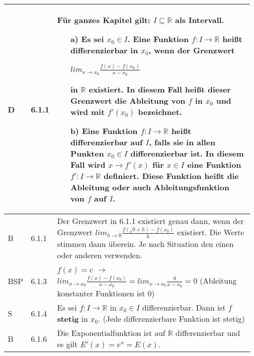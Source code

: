     \begin{longtable}{p{0.75cm} p{1cm} p{16cm}}
        \toprule

        D   & 6.1.1 &   Für ganzes Kapitel gilt: $I \subseteq \mathbb{R}$ als Intervall.
                        \begin{itemize}[topsep=-0.5cm]
                            \item[a)] Es sei $x_0 \in I$. Eine Funktion $f: I \rightarrow \mathbb{R}$ heißt differenzierbar in $x_0$, wenn der Grenzwert 
                                        \centerline{$lim_{x \rightarrow x_0} \frac{f(x)-f(x_0)}{x-x_0}$}
                                        in $\mathbb{R}$ existiert. In diesem Fall heißt dieser Grenzwert die \textbf{Ableitung} von $f$ in $x_0$ und wird 
                                        mit \textbf{$f'(x_0)$} bezeichnet.
                            \item[b)] Eine Funktion $f: I \rightarrow \mathbb{R}$ heißt \textbf{differenzierbar} auf $I$, falls sie in allen Punkten
                                        $x_0 \in I$ differenzierbar ist. In diesem Fall wird $x \rightarrow f'(x)$  für $x \in I$ eine Funktion 
                                        $f': I \rightarrow \mathbb{R}$ definiert. Diese Funktion heißt die \textbf{Ableitung} oder auch 
                                        \textbf{Ableitungsfunktion} von $f$ auf $I$.
                        \end{itemize} \vspace{-0cm} \\
        \midrule
        B   & 6.1.1 &   Der Grenzwert in 6.1.1 existiert genau dann, wenn der Grenzwert $lim_{h \rightarrow 0} \frac{f(_x0 + h)-f(x_0)}{h}$
                        existiert. Die Werte stimmen dann überein. Je nach Situation den einen oder anderen verwenden. \\
        \midrule
        BSP & 6.1.3 &   $f(x) = c$ $\rightarrow$ $lim_{x \rightarrow x_0} \frac{f(x)-f(x_0)}{x-x_0} = lim_{x \rightarrow x_0}
                        \frac{0}{x-x_0} = 0$ (Ableitung konstanter Funktionen ist 0) \\
        \midrule
        S   & 6.1.4 &   Es sei $f: I \rightarrow \mathbb{R}$ in $x_0 \in I$ differenzierbar. Dann ist $f$ \textbf{stetig} in $x_0$. \hfill \break
                        (Jede differenzierbare Funktion ist stetig) \\
        \midrule
        B   & 6.1.6 &   Die Exponentialfunktion ist auf $\mathbb{R}$ differenzierbar und es gilt $E'(x) = e^x = E(x)$. \\

\end{longtable}
